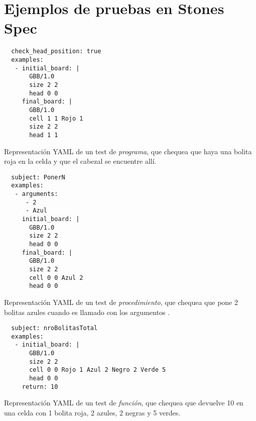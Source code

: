 
\renewcommand{\appendixname}{Apéndice}
\renewcommand{\appendixtocname}{Apéndice}
\renewcommand{\appendixpagename}{Apéndice}

\begin{appendices}

\label{app:Specs}
\section{Ejemplos de pruebas en Stones Spec}

\begin{listing}
  \centering

  \begin{verbatim}
  check_head_position: true
  examples:
   - initial_board: |
       GBB/1.0
       size 2 2
       head 0 0
     final_board: |
       GBB/1.0
       cell 1 1 Rojo 1
       size 2 2
       head 1 1
  \end{verbatim}

  \caption{Representación YAML de un test de \emph{programa}, que chequea que haya una bolita roja en la celda  y que el cabezal se encuentre allí.}
  \label{lst:ProgramSpec}
\end{listing}

\begin{listing}
  \centering

  \begin{verbatim}
  subject: PonerN
  examples:
   - arguments:
      - 2
      - Azul
     initial_board: |
       GBB/1.0
       size 2 2
       head 0 0
     final_board: |
       GBB/1.0
       size 2 2
       cell 0 0 Azul 2
       head 0 0
  \end{verbatim}

  \caption{Representación YAML de un test de \emph{procedimiento}, que chequea que  pone 2 bolitas azules cuando es llamado con los argumentos .}
  \label{lst:ProcedureSpec}
\end{listing}

\begin{listing}
  \centering

  \begin{verbatim}
  subject: nroBolitasTotal
  examples:
   - initial_board: |
       GBB/1.0
       size 2 2
       cell 0 0 Rojo 1 Azul 2 Negro 2 Verde 5
       head 0 0
     return: 10
  \end{verbatim}

  \caption{Representación YAML de un test de \emph{función}, que chequea que  devuelve 10 en una celda con 1 bolita roja, 2 azules, 2 negras y 5 verdes.}
  \label{lst:FunctionSpec}
\end{listing}

\end{appendices}
